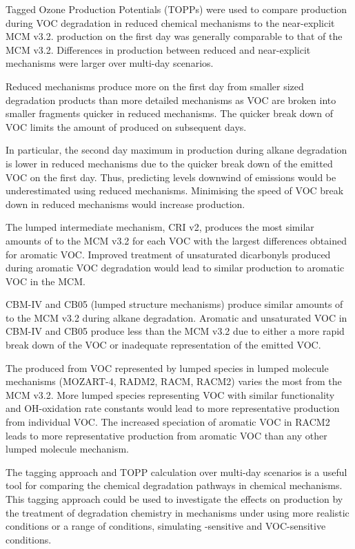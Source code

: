 Tagged Ozone Production Potentials (TOPPs) were used to compare  production during VOC degradation in reduced chemical mechanisms to the near-explicit MCM v3.2. 
 production on the first day was generally comparable to that of the MCM v3.2.
Differences in  production between reduced and near-explicit mechanisms were larger over multi-day scenarios.

Reduced mechanisms produce more  on the first day from smaller sized degradation products than more detailed mechanisms as VOC are broken into smaller fragments quicker in reduced mechanisms.
The quicker break down of VOC limits the amount of  produced on subsequent days.

In particular, the second day maximum in  production during alkane degradation is lower in reduced mechanisms due to the quicker break down of the emitted VOC on the first day.
Thus, predicting  levels downwind of emissions would be underestimated using reduced mechanisms.
Minimising the speed of VOC break down in reduced mechanisms would increase  production.  

The lumped intermediate mechanism, CRI v2, produces the most similar amounts of  to the MCM v3.2 for each VOC with the largest differences obtained for aromatic VOC.
Improved treatment of unsaturated dicarbonyls produced during aromatic VOC degradation would lead to similar  production to aromatic VOC in the MCM.

CBM-IV and CB05 (lumped structure mechanisms) produce similar amounts of  to the MCM v3.2 during alkane degradation.
Aromatic and unsaturated VOC in CBM-IV and CB05 produce less  than the MCM v3.2 due to either a more rapid break down of the VOC or inadequate representation of the emitted VOC.

The  produced from VOC represented by lumped species in lumped molecule mechanisms (MOZART-4, RADM2, RACM, RACM2) varies the most from the MCM v3.2.
More lumped species representing VOC with similar functionality and OH-oxidation rate constants would lead to more representative  production from individual VOC.
The increased speciation of aromatic VOC in RACM2 leads to more representative  production from aromatic VOC than any other lumped molecule mechanism.

The tagging approach and TOPP calculation over multi-day scenarios is a useful tool for comparing the chemical degradation pathways in chemical mechanisms. 
This tagging approach could be used to investigate the effects on  production by the treatment of degradation chemistry in mechanisms under using more realistic  conditions or a range of  conditions, simulating -sensitive and VOC-sensitive conditions.
